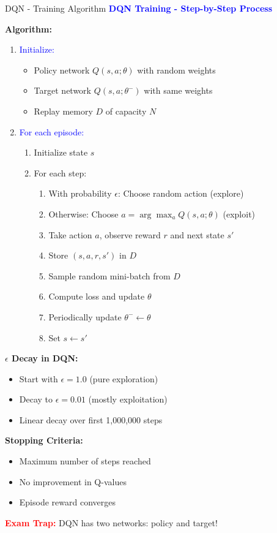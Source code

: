 \documentclass[8pt]{beamer}
\begin{document}
\begin{frame}{DQN - Training Algorithm}
\fontsize{6.5}{7.5}\selectfont
\textcolor{blue}{\textbf{DQN Training - Step-by-Step Process}}

\textbf{Algorithm:}
\begin{enumerate}
\item \textcolor{blue}{Initialize:}
\begin{itemize}
\item Policy network $Q(s,a;\theta)$ with random weights
\item Target network $Q(s,a;\theta^-)$ with same weights
\item Replay memory $D$ of capacity $N$
\end{itemize}

\item \textcolor{blue}{For each episode:}
\begin{enumerate}
\item Initialize state $s$
\item For each step:
\begin{enumerate}
\item With probability $\epsilon$: Choose random action (explore)
\item Otherwise: Choose $a = \arg\max_a Q(s,a;\theta)$ (exploit)
\item Take action $a$, observe reward $r$ and next state $s'$
\item Store $(s,a,r,s')$ in $D$
\item Sample random mini-batch from $D$
\item Compute loss and update $\theta$
\item Periodically update $\theta^- \leftarrow \theta$
\item Set $s \leftarrow s'$
\end{enumerate}
\end{enumerate}
\end{enumerate}

\textbf{$\epsilon$ Decay in DQN:}
\begin{itemize}
\item Start with $\epsilon = 1.0$ (pure exploration)
\item Decay to $\epsilon = 0.01$ (mostly exploitation)
\item Linear decay over first 1,000,000 steps
\end{itemize}

\textbf{Stopping Criteria:}
\begin{itemize}
\item Maximum number of steps reached
\item No improvement in Q-values
\item Episode reward converges
\end{itemize}

\textcolor{red}{\textbf{Exam Trap:}} DQN has two networks: policy and target!
\end{frame}
\end{document}
